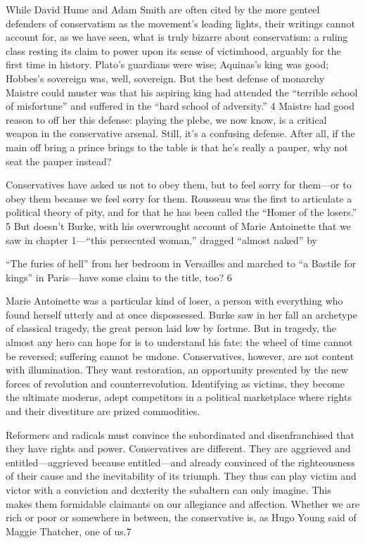 While David Hume and Adam Smith are often cited by the more genteel defenders of conservatism as the movement’s leading lights, their writings cannot account for, as we have seen, what is truly bizarre about conservatism: a ruling class resting its claim to power upon its sense of victimhood, arguably for the first time in history. Plato’s guardians were wise; Aquinas’s king was good; Hobbes’s sovereign was, well, sovereign. But the best defense of monarchy Maistre could muster was that his aspiring king had attended the “terrible school of misfortune” and suffered in the “hard school of adversity.” {\color{blue}4} Maistre had good reason to off her this defense: playing the plebe, we now know, is a critical weapon in the conservative arsenal. Still, it’s a confusing defense. After all, if the main off bring a prince brings to the table is that he’s really a pauper, why not seat the pauper instead?
 \par 
Conservatives have asked us not to obey them, but to feel sorry for them—or to obey them because we feel sorry for them. Rousseau was the first to articulate a political theory of pity, and for that he has been called the “Homer of the losers.” {\color{blue}5} But doesn’t Burke, with his overwrought account of Marie Antoinette that we saw in chapter 1—“this persecuted woman,” dragged “almost naked” by
 \par 
“The furies of hell” from her bedroom in Versailles and marched to “a Bastile for kings” in Paris—have some claim to the title, too? {\color{blue}6}
 \par 
Marie Antoinette was a particular kind of loser, a person with everything who found herself utterly and at once dispossessed. Burke saw in her fall an archetype of classical tragedy, the great person laid low by fortune. But in tragedy, the almost any hero can hope for is to understand his fate: the wheel of time cannot be reversed; suffering cannot be undone. Conservatives, however, are not content with illumination. They want restoration, an opportunity presented by the new forces of revolution and counterrevolution. Identifying as victims, they become the ultimate moderns, adept competitors in a political marketplace where rights and their divestiture are prized commodities.
 \par 
Reformers and radicals must convince the subordinated and disenfranchised that they have rights and power. Conservatives are different. They are aggrieved and entitled—aggrieved because entitled—and already convinced of the righteousness of their cause and the inevitability of its triumph. They thus can play victim and victor with a conviction and dexterity the subaltern can only imagine. This makes them formidable claimants on our allegiance and affection. Whether we are rich or poor or somewhere in between, the conservative is, as Hugo Young said of Maggie Thatcher, one of us.{\color{blue}7}

